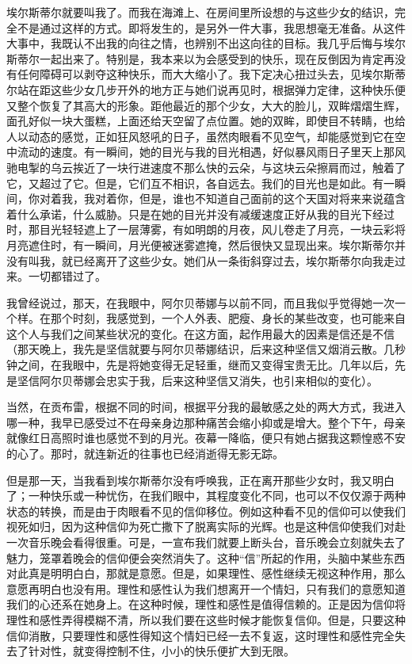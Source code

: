 \par 埃尔斯蒂尔就要叫我了。而我在海滩上、在房间里所设想的与这些少女的结识，完全不是通过这样的方式。即将发生的，是另外一件大事，我思想毫无准备。从这件大事中，我既认不出我的向往之情，也辨别不出这向往的目标。我几乎后悔与埃尔斯蒂尔一起出来了。特别是，我本来以为会感受到的快乐，现在反倒因为肯定再没有任何障碍可以剥夺这种快乐，而大大缩小了。我下定决心扭过头去，见埃尔斯蒂尔站在距这些少女几步开外的地方正与她们说再见时，根据弹力定律，这种快乐便又整个恢复了其高大的形象。距他最近的那个少女，大大的脸儿，双眸熠熠生辉，面孔好似一块大蛋糕，上面还给天空留了点位置。她的双眸，即使目不转睛，也给人以动态的感觉，正如狂风怒吼的日子，虽然肉眼看不见空气，却能感觉到它在空中流动的速度。有一瞬间，她的目光与我的目光相遇，好似暴风雨日子里天上那风驰电掣的乌云挨近了一块行进速度不那么快的云朵，与这块云朵擦肩而过，触着了它，又超过了它。但是，它们互不相识，各自远去。我们的目光也是如此。有一瞬间，你对着我，我对着你，但是，谁也不知道自己面前的这个天国对将来来说蕴含着什么承诺，什么威胁。只是在她的目光并没有减缓速度正好从我的目光下经过时，那目光轻轻遮上了一层薄雾，有如明朗的月夜，风儿卷走了月亮，一块云彩将月亮遮住时，有一瞬间，月光便被迷雾遮掩，然后很快又显现出来。埃尔斯蒂尔并没有叫我，就已经离开了这些少女。她们从一条街斜穿过去，埃尔斯蒂尔向我走过来。一切都错过了。
\par 我曾经说过，那天，在我眼中，阿尔贝蒂娜与以前不同，而且我似乎觉得她一次一个样。在那个时刻，我感觉到，一个人外表、肥瘦、身长的某些改变，也可能来自这个人与我们之间某些状况的变化。在这方面，起作用最大的因素是信还是不信（那天晚上，我先是坚信就要与阿尔贝蒂娜结识，后来这种坚信又烟消云散。几秒钟之间，在我眼中，先是将她变得无足轻重，继而又变得宝贵无比。几年以后，先是坚信阿尔贝蒂娜会忠实于我，后来这种坚信又消失，也引来相似的变化）。
\par 当然，在贡布雷，根据不同的时间，根据平分我的最敏感之处的两大方式，我进入哪一种，我早已感受过不在母亲身边那种痛苦会缩小抑或是增大。整个下午，母亲就像红日高照时谁也感觉不到的月光。夜幕一降临，便只有她占据我这颗惶惑不安的心了。那时，就连新近的往事也已经消逝得无影无踪。
\par 但是那一天，当我看到埃尔斯蒂尔没有呼唤我，正在离开那些少女时，我又明白了；一种快乐或一种忧伤，在我们眼中，其程度变化不同，也可以不仅仅源于两种状态的转换，而是由于肉眼看不见的信仰移位。例如这种看不见的信仰可以使我们视死如归，因为这种信仰为死亡撒下了脱离实际的光辉。也是这种信仰使我们对赴一次音乐晚会看得很重。可是，一宣布我们就要上断头台，音乐晚会立刻就失去了魅力，笼罩着晚会的信仰便会突然消失了。这种“信”所起的作用，头脑中某些东西对此真是明明白白，那就是意愿。但是，如果理性、感性继续无视这种作用，那么意愿再明白也没有用。理性和感性认为我们想离开一个情妇，只有我们的意愿知道我们的心还系在她身上。在这种时候，理性和感性是值得信赖的。正是因为信仰将理性和感性弄得模糊不清，所以我们要在这些时候才能恢复信仰。但是，只要这种信仰消散，只要理性和感性得知这个情妇已经一去不复返，这时理性和感性完全失去了针对性，就变得控制不住，小小的快乐便扩大到无限。
